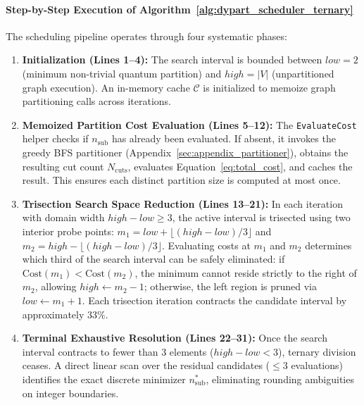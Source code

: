 \documentclass[pdflatex,sn-mathphys-num]{sn-jnl}
\theoremstyle{thmstyleone}
\theoremstyle{thmstyletwo}%
\theoremstyle{thmstylethree}%
\begin{document}
\paragraph{Step-by-Step Execution of Algorithm~\ref{alg:dypart_scheduler_ternary}}
The scheduling pipeline operates through four systematic phases:
\begin{enumerate}
    \item \textbf{Initialization (Lines 1--4):} The search interval is bounded between $low = 2$ (minimum non-trivial quantum partition) and $high = |V|$ (unpartitioned graph execution). An in-memory cache $\mathcal{C}$ is initialized to memoize graph partitioning calls across iterations.
    \item \textbf{Memoized Partition Cost Evaluation (Lines 5--12):} The \texttt{EvaluateCost} helper checks if $n_{\text{sub}}$ has already been evaluated. If absent, it invokes the greedy BFS partitioner (Appendix~\ref{sec:appendix_partitioner}), obtains the resulting cut count $N_{\text{cuts}}$, evaluates Equation~\eqref{eq:total_cost}, and caches the result. This ensures each distinct partition size is computed at most once.
    \item \textbf{Trisection Search Space Reduction (Lines 13--21):} In each iteration with domain width $high - low \ge 3$, the active interval is trisected using two interior probe points: $m_1 = low + \lfloor(high - low)/3\rfloor$ and $m_2 = high - \lfloor(high - low)/3\rfloor$. Evaluating costs at $m_1$ and $m_2$ determines which third of the search interval can be safely eliminated: if $\text{Cost}(m_1) < \text{Cost}(m_2)$, the minimum cannot reside strictly to the right of $m_2$, allowing $high \leftarrow m_2 - 1$; otherwise, the left region is pruned via $low \leftarrow m_1 + 1$. Each trisection iteration contracts the candidate interval by approximately $33\%$.
    \item \textbf{Terminal Exhaustive Resolution (Lines 22--31):} Once the search interval contracts to fewer than 3 elements ($high - low < 3$), ternary division ceases. A direct linear scan over the residual candidates ($\le 3$ evaluations) identifies the exact discrete minimizer $n_{\text{sub}}^*$, eliminating rounding ambiguities on integer boundaries.
\end{enumerate}
\end{document}

